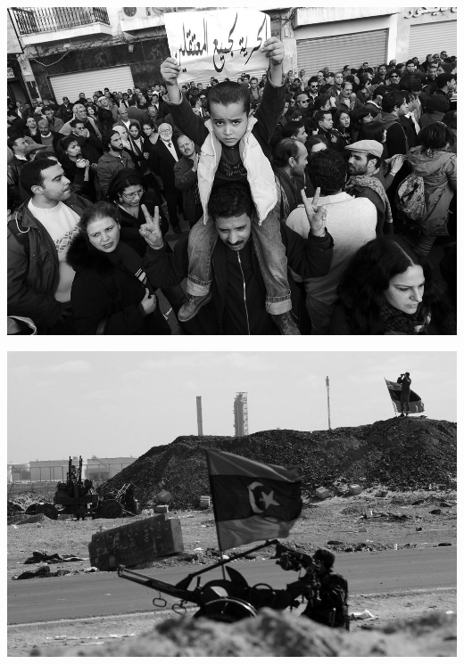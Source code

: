 \documentclass[a4paper,12pt]{minimal}
\begin{document}
\includegraphics[angle=90, width=\textwidth]{images/arabspring4}

\includegraphics[angle=90, width=\textwidth]{images/arabspring5}
\end{document}
